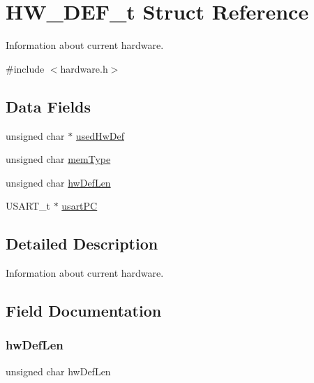 \hypertarget{struct_h_w___d_e_f__t}{}\section{H\+W\+\_\+\+D\+E\+F\+\_\+t Struct Reference}
\label{struct_h_w___d_e_f__t}


Information about current hardware.  




{\ttfamily \#include $<$hardware.\+h$>$}

\subsection*{Data Fields}
\begin{DoxyCompactItemize}
\item 
unsigned char $\ast$ \hyperlink{struct_h_w___d_e_f__t_af1482ffe338f49d3705da83e7de3538d}{used\+Hw\+Def}
\item 
unsigned char \hyperlink{struct_h_w___d_e_f__t_adc6539f9268f7a55973aa310013a9e8f}{mem\+Type}
\item 
unsigned char \hyperlink{struct_h_w___d_e_f__t_a631f0a49d9205f74b328b92867cc7cc9}{hw\+Def\+Len}
\item 
U\+S\+A\+R\+T\+\_\+t $\ast$ \hyperlink{struct_h_w___d_e_f__t_a76e679a4a31621b37c55dcc24f841e95}{usart\+PC}
\end{DoxyCompactItemize}


\subsection{Detailed Description}
Information about current hardware. 

\subsection{Field Documentation}
\mbox{\label{struct_h_w___d_e_f__t_a631f0a49d9205f74b328b92867cc7cc9}} 
\subsubsection{\texorpdfstring{hw\+Def\+Len}{hwDefLen}}
{\footnotesize\ttfamily unsigned char hw\+Def\+Len}

